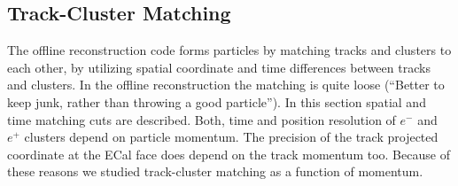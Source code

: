 \documentclass[letterpaper,12pt]{article}
\begin{document}
\subsection{Track-Cluster Matching}
The offline reconstruction code forms particles by matching tracks and clusters to each other, by utilizing spatial coordinate and time differences between tracks and clusters.
In the offline reconstruction the matching is quite loose (``Better to keep junk, rather than throwing a good particle''). In this section spatial and time matching cuts are described. Both, time and position resolution of $e^{-}$ and $e^{+}$ clusters depend on particle momentum. The precision of the track projected coordinate at the ECal face does depend on the track momentum too. Because of these reasons we studied track-cluster matching as a function of momentum.
\end{document}
